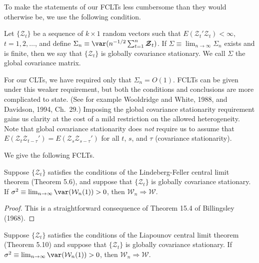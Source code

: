 To make the statements of our FCLTs less cumbersome than they would otherwise be, we use the following condition.

\begin{definition}\label{def:global-cov-stat}
Let $\{\boldsymbol{\mathcal{Z}}_t\}$ be a sequence of $k \times 1$ random vectors such that $E(\boldsymbol{\mathcal{Z}}_t' \boldsymbol{\mathcal{Z}}_t) < \infty$, $t = 1, 2, \ldots$, and define $\Sigma_n \equiv \var(n^{-1/2} \sum_{t=1}^{n} \boldsymbol{\mathcal{Z}}_t)$. If $\Sigma \equiv \lim_{n \to \infty} \Sigma_n$ exists and is finite, then we say that $\{\boldsymbol{\mathcal{Z}}_t\}$ is globally covariance stationary. We call $\Sigma$ the global covariance matrix.
\end{definition}

For our CLTs, we have required only that $\Sigma_n = O(1)$. FCLTs can be given under this weaker requirement, but both the conditions and conclusions are more complicated to state. (See for example Wooldridge and White, 1988, and Davidson, 1994, Ch.\ 29.) Imposing the global covariance stationarity requirement gains us clarity at the cost of a mild restriction on the allowed heterogeneity. Note that global covariance stationarity does \emph{not} require us to assume that $E(\boldsymbol{\mathcal{Z}}_t \boldsymbol{\mathcal{Z}}_{t-\tau}') = E(\boldsymbol{\mathcal{Z}}_s \boldsymbol{\mathcal{Z}}_{s-\tau}')$ for all $t$, $s$, and $\tau$ (covariance stationarity).

We give the following FCLTs.

\begin{theorem}\label{thm:lf-fclt}
Suppose $\{\mathcal{Z}_t\}$ satisfies the conditions of the Lindeberg-Feller central limit theorem (Theorem 5.6), and suppose that $\{\mathcal{Z}_t\}$ is globally covariance stationary. If $\sigma^2 \equiv \lim_{n\to\infty} \var(\mathcal{W}_n(1)) > 0$, then $\mathcal{W}_n \Rightarrow \mathcal{W}$.
\end{theorem}

\begin{proof}
This is a straightforward consequence of Theorem 15.4 of Billingsley (1968).
\end{proof}

\begin{theorem}\label{thm:liapounov-fclt}
Suppose $\{\mathcal{Z}_t\}$ satisfies the conditions of the Liapounov central limit theorem (Theorem 5.10) and suppose that $\{\mathcal{Z}_t\}$ is globally covariance stationary. If $\sigma^2 \equiv \lim_{n\to\infty} \var(\mathcal{W}_n(1)) > 0$, then $\mathcal{W}_n \Rightarrow \mathcal{W}$.
\end{theorem}


